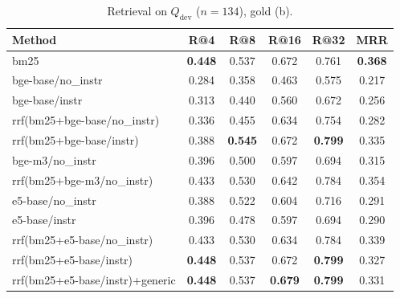 \begin{table}[t]
\centering
\caption{Retrieval on $Q_{\text{dev}}$ ($n=134$), gold (b).}
\begin{tabular}{lccccc}
\toprule
Method & R@4 & R@8 & R@16 & R@32 & MRR \\
\midrule
bm25 & \textbf{0.448} & 0.537 & 0.672 & 0.761 & \textbf{0.368} \\
bge-base/no\_instr & 0.284 & 0.358 & 0.463 & 0.575 & 0.217 \\
bge-base/instr & 0.313 & 0.440 & 0.560 & 0.672 & 0.256 \\
rrf(bm25+bge-base/no\_instr) & 0.336 & 0.455 & 0.634 & 0.754 & 0.282 \\
rrf(bm25+bge-base/instr) & 0.388 & \textbf{0.545} & 0.672 & \textbf{0.799} & 0.335 \\
bge-m3/no\_instr & 0.396 & 0.500 & 0.597 & 0.694 & 0.315 \\
rrf(bm25+bge-m3/no\_instr) & 0.433 & 0.530 & 0.642 & 0.784 & 0.354 \\
e5-base/no\_instr & 0.388 & 0.522 & 0.604 & 0.716 & 0.291 \\
e5-base/instr & 0.396 & 0.478 & 0.597 & 0.694 & 0.290 \\
rrf(bm25+e5-base/no\_instr) & 0.433 & 0.530 & 0.634 & 0.784 & 0.339 \\
rrf(bm25+e5-base/instr) & \textbf{0.448} & 0.537 & 0.672 & \textbf{0.799} & 0.327 \\
rrf(bm25+e5-base/instr)+generic & \textbf{0.448} & 0.537 & \textbf{0.679} & \textbf{0.799} & 0.331 \\
\bottomrule
\end{tabular}
\end{table}
